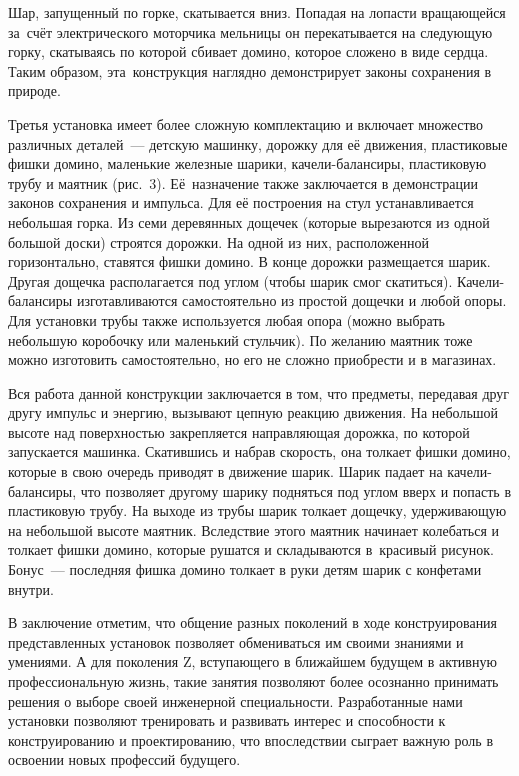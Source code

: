 

Шар, запущенный по горке, скатывается вниз. Попадая на лопасти вращающейся за~счёт электрического моторчика мельницы он перекатывается на следующую горку, скатываясь по которой сбивает домино, которое сложено в виде сердца. Таким образом, эта~конструкция наглядно демонстрирует законы сохранения в природе.

Третья установка имеет более сложную комплектацию и включает множество различных деталей~--- детскую машинку, дорожку для её движения, пластиковые фишки домино, маленькие железные шарики, качели-балансиры, пластиковую трубу и маятник (рис.~3). Её~назначение также заключается в демонстрации законов сохранения и импульса. Для её построения на стул устанавливается небольшая горка. Из семи деревянных дощечек (которые вырезаются из одной большой доски) строятся дорожки. На одной из них, расположенной горизонтально, ставятся фишки домино. В конце дорожки размещается шарик. Другая дощечка располагается под углом (чтобы шарик смог скатиться). Качели-балансиры изготавливаются самостоятельно из простой дощечки и любой опоры. Для установки трубы также используется любая опора (можно выбрать небольшую коробочку или маленький стульчик). По желанию маятник тоже можно изготовить самостоятельно, но его не сложно приобрести и в магазинах.



Вся работа данной конструкции заключается в том, что предметы, передавая друг другу импульс и энергию, вызывают цепную реакцию движения. На небольшой высоте над поверхностью закрепляется направляющая дорожка, по которой запускается машинка. Скатившись и набрав скорость, она толкает фишки домино, которые в свою очередь приводят в движение шарик.  Шарик падает на качели-балансиры, что позволяет другому шарику подняться под углом вверх и попасть в пластиковую трубу. На выходе из трубы шарик толкает дощечку, удерживающую на небольшой высоте маятник. Вследствие этого маятник начинает колебаться и толкает фишки домино, которые рушатся и складываются в~красивый рисунок. Бонус~--- последняя фишка домино толкает в руки детям шарик с конфетами внутри.

В заключение отметим, что общение разных поколений в ходе конструирования представленных установок позволяет обмениваться им своими знаниями и умениями. А для поколения Z, вступающего в ближайшем будущем в активную профессиональную жизнь, такие занятия позволяют более осознанно принимать решения о выборе своей инженерной специальности. Разработанные нами установки позволяют тренировать и развивать интерес и способности к конструированию и проектированию, что впоследствии сыграет важную роль в освоении новых профессий будущего.


